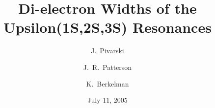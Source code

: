 \documentclass[aps,prd,preprint,superscriptaddress,tightenlines,nofootinbib,floatfix]{revtex4}
\begin{document}

\newcommand{\etal}{{\it et al.}}
\newcommand{\ee}{$e^+e^-$}
\newcommand{\mm}{$\mu^+\mu^-$}

\newcommand{\subs}[1]{{\mbox{\scriptsize #1}}}
\newcommand{\re}{\mathrm{Re\:}}
\newcommand{\gee}{$\Gamma_{ee}$}
\newcommand{\ups}{$\Upsilon$}
\newcommand{\uone}{$\Upsilon(1S)$}
\newcommand{\utwo}{$\Upsilon(2S)$}
\newcommand{\uthree}{$\Upsilon(3S)$}
\newcommand{\mpprec}{$m_\subs{$\pi\pi$-rec}$}
\newcommand{\bbar}{$b\bar{b}$}
\newcommand{\inv}{$^{-1}$}
\newcommand{\twotoone}{$\Upsilon(2S) \to \pi^+\pi^- \Upsilon(1S)$}
\newcommand{\pip}{$\pi^+\pi^-$}
\newcommand{\tautau}{$\tau^+\tau^-$}
\newcommand{\dxy}{$d_{XY}$}
\newcommand{\dz}{$d_Z$}



\title{Di-electron Widths of the Upsilon(1S,2S,3S) Resonances}



\author{J.~Pivarski}
\author{J.~R.~Patterson}
\author{K.~Berkelman}
\noaffiliation



\date{July 11, 2005}
\end{document}
